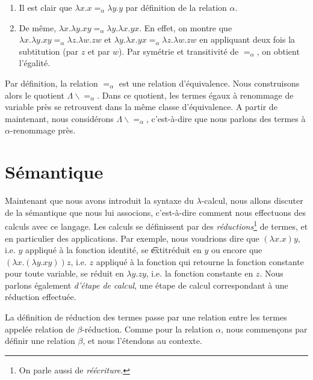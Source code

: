 \begin{exemple}
  \begin{enumerate}
    \item Il est clair que $\lambda x . x =_{\alpha} \lambda y . y$ par
    définition de la relation $\alpha$.
    \item De même, $\lambda x . \lambda y . x y =_{\alpha} \lambda y . \lambda x
      . y x$. En
      effet, on montre que $\lambda x . \lambda y . x y =_{\alpha} \lambda z .
      \lambda w. z
      w$ et $\lambda y . \lambda x . y x =_{\alpha} \lambda z . \lambda w . z w$ en appliquant
      deux fois la subtitution (par $z$ et par $w$). Par symétrie
      et transitivité de $=_{\alpha}$, on obtient l'égalité.
  \end{enumerate}
\end{exemple}

Par définition, la relation $=_{\alpha}$ est une relation d'équivalence. Nous
construisons alors le quotient $\Lambda \backslash =_{\alpha}$. Dans ce
quotient, les termes égaux à renommage de variable près se retrouvent dans la
même classe d'équivalence. A partir de maintenant, nous considérons $\Lambda
\backslash =_{\alpha}$, c'est-à-dire que nous parlons des termes à $\alpha$-renommage près.

\section{Sémantique}

Maintenant que nous avons introduit la syntaxe du $\lambda$-calcul, nous allons
discuter de la sémantique que nous lui associons, c'est-à-dire comment nous
effectuons des calculs avec ce langage. Les calculs
se définissent par des \textit{réductions}\footnote{On parle aussi de
\textit{réécriture}.} de termes, et en particulier des applications. Par exemple,
nous voudrions dire que $(\lambda x . x) y$, i.e. $y$ appliqué à la fonction
identité, se \t
extit{réduit} en $y$ ou encore que $(\lambda x . (\lambda y . x
y)) z$, i.e. $z$ appliqué à la fonction qui retourne la fonction
constante pour toute variable, se réduit en $\lambda y . z y$, i.e. la fonction
constante en $z$. Nous parlons également \textit{d'étape de calcul}, une étape
de calcul correspondant à une réduction effectuée.

La définition de réduction des termes passe par une relation entre les
termes appelée relation de $\beta$-réduction.
Comme pour la relation $\alpha$, nous commençons par définir une relation
$\beta$, et nous l'étendons au contexte.

